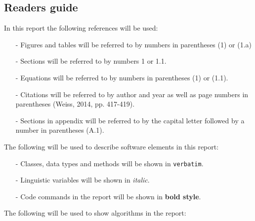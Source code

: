 \documentclass[../Head/Main.tex]{subfiles}
\begin{document}


\clearpage
\subsection{Readers guide}

In this report the following references will be used:

\begin{itemize}

\item[-] Figures and tables will be referred to by numbers in parentheses (1) or (1.a)
\item[-] Sections will be referred to by numbers 1 or 1.1.
\item[-] Equations will be referred to by numbers in parentheses (1) or (1.1).
\item[-] Citations will be referred to by author and year as well as page numbers in parentheses (Weiss, 2014, pp. 417-419). 
\item[-] Sections in appendix will be referred to by the capital letter followed by a number in parentheses (A.1).   
\end{itemize}

\vspace{20pt}
The following will be used to describe software elements in this report:

\begin{itemize}
\item[-] Classes, data types and methods will be shown in \texttt{verbatim}. 
\item[-] Linguistic variables will be shown in \textit{italic}.
\item[-] Code commands in the report will be shown in \textbf{bold style}.
 
\end{itemize}
\vspace{20pt}
The following will be used to show algorithms in the report: 


\end{document}

